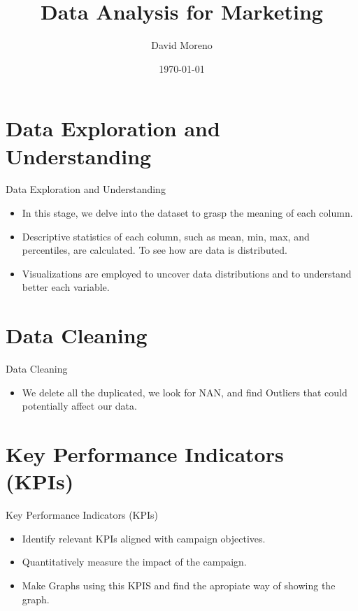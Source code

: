 \documentclass{beamer}
\title{Data Analysis for Marketing}
\author{David Moreno}
\date{\today}
\begin{document}
	
	\maketitle
	
\section{Data Exploration and Understanding}
\begin{frame}{Data Exploration and Understanding}
	\begin{itemize}
		\item In this stage, we delve into the dataset to grasp the meaning of each column.
		\item Descriptive statistics of each column, such as mean, min, max, and percentiles, are calculated. To see how are data is distributed.
		\item Visualizations are employed to uncover data distributions and to understand better each variable.
		
	\end{itemize}
\end{frame}
	
	\section{Data Cleaning}
	\begin{frame}{Data Cleaning}
		\begin{itemize}
			\item We delete all the duplicated, we look for NAN, and find Outliers that could potentially affect our data.

		\end{itemize}
	\end{frame}
	
	\section{Key Performance Indicators (KPIs)}
	\begin{frame}{Key Performance Indicators (KPIs)}
		\begin{itemize}
			\item Identify relevant KPIs aligned with campaign objectives.
			\item Quantitatively measure the impact of the campaign.
			\item Make Graphs using this KPIS and find the apropiate way of showing the graph.
		\end{itemize}
	\end{frame}
	
\end{document}

